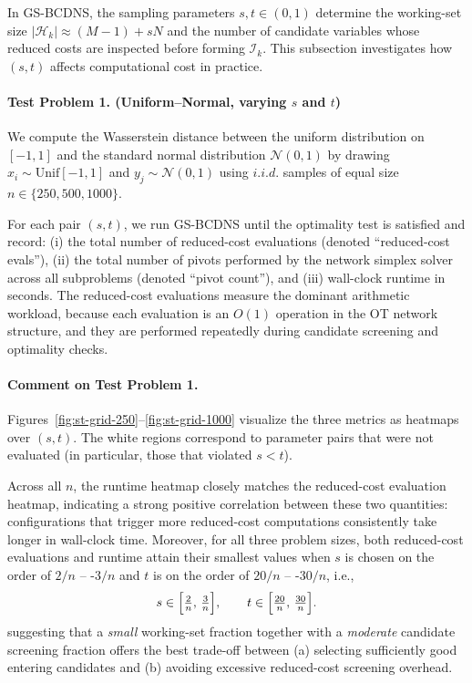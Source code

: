 \documentclass[12pt,a4paper]{article}
\begin{document}
In GS-BCDNS, the sampling parameters $s,t\in(0,1)$ determine the working-set size
$\lvert\mathcal H_k\rvert \approx (M-1) + sN$ and the number of candidate variables
whose reduced costs are inspected before forming $\mathcal I_k$.
This subsection investigates how $(s,t)$ affects computational cost in practice.



\paragraph{Test Problem 1. (Uniform--Normal, varying $s$ and $t$)}
We compute the Wasserstein distance between the uniform distribution on $[-1,1]$
and the standard normal distribution $\mathcal N(0,1)$ by drawing
$x_i \sim \mathrm{Unif}[-1,1]$ and $y_j \sim \mathcal N(0,1)$ using
$i.i.d.$ samples of equal size $n\in\{250,500,1000\}$.


For each pair $(s,t)$, we run GS-BCDNS until
the optimality test is satisfied and record:
(i) the total number of reduced-cost evaluations (denoted ``reduced-cost evals''),
(ii) the total number of pivots performed by the network simplex solver across all subproblems
(denoted ``pivot count''), and
(iii) wall-clock runtime in seconds.
The reduced-cost evaluations measure the dominant arithmetic workload, because each
evaluation is an $O(1)$ operation in the OT network structure, and they are performed
repeatedly during candidate screening and optimality checks.


\paragraph{Comment on Test Problem 1.}
Figures~\ref{fig:st-grid-250}--\ref{fig:st-grid-1000} visualize the three metrics as heatmaps over $(s,t)$. The white regions correspond to parameter pairs that were not evaluated (in particular, those that violated $s<t$).

Across all $n$, the runtime heatmap closely matches the reduced-cost evaluation heatmap,
indicating a strong positive correlation between these two quantities: configurations that
trigger more reduced-cost computations consistently take longer in wall-clock time.
Moreover, for all three problem sizes, both reduced-cost evaluations and runtime attain their smallest values when $s$ is chosen on the order of $2/n$ -- -$3/n$ and
$t$ is on the order of $20/n$ -- -$30/n$, i.e.,
\[
s \in \Bigl[\tfrac{2}{n},\,\tfrac{3}{n}\Bigr], \qquad
t \in \Bigl[\tfrac{20}{n},\,\tfrac{30}{n}\Bigr].
\]
suggesting that a \emph{small} working-set fraction together with a \emph{moderate} candidate
screening fraction offers the best trade-off between (a) selecting sufficiently good entering
candidates and (b) avoiding excessive reduced-cost screening overhead.
\end{document}

